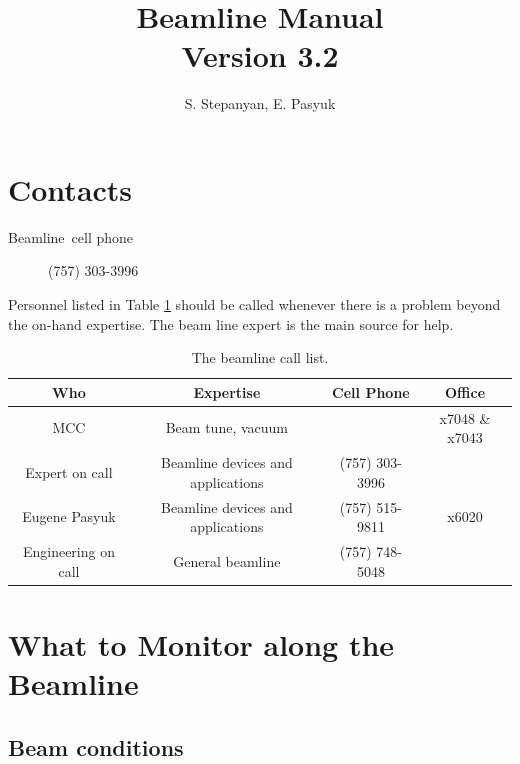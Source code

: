 \documentclass[12pt]{article}
\newcommand{\versionnumber}{3.2}
\begin{document}
\title{Beamline Manual\\\normalsize Version \versionnumber}
\author{S. Stepanyan, E. Pasyuk}
\maketitle



\section{Contacts\label{beamline_contacts}}

\begin{description}
\item [Beamline~cell phone] (757) 303-3996
\end{description}

Personnel listed in Table \ref{tab:calllist} should be called whenever there
is a problem beyond the on-hand expertise. The beam line expert is the main source for help.  
\begin{table}[tbhp]
\vspace{0.3cm}
{\centering \begin{tabular}{|c|c|c|c|}
\hline 
Who&Expertise&Cell Phone&Office\\
\hline 
\hline 
MCC&Beam tune, vacuum&&x7048 \& x7043\\
\hline 
Expert on call&Beamline devices and applications&(757) 303-3996&\\
\hline 
Eugene Pasyuk&Beamline devices and applications&(757) 515-9811&x6020\\
\hline 
Engineering on call&General beamline&(757) 748-5048&\\
\hline 
\end{tabular}\par}
\vspace{0.3cm}


\caption{The beamline call list.\label{tab:calllist}}
\end{table} 



\section{What to Monitor along the Beamline}


\subsection{Beam conditions}
\indent
\end{document}
